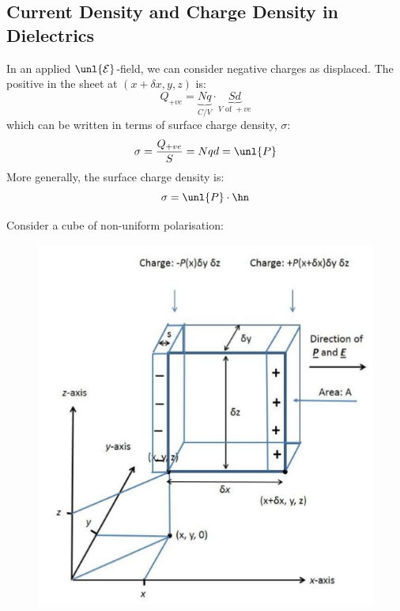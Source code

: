 \documentclass[a4paper, 11pt, normalem]{report}
\renewcommand\E{\mathcal{E}}
\newcommand\uE{\unl{\E}}
\begin{document}
\subsection{Current Density and Charge Density in Dielectrics}
In an applied $\uE$-field, we can consider negative charges as displaced.
The positive in the sheet at $(x+\delta x, y, z)$ is:
\begin{equation}
    Q_{+ve} = \underbrace{Nq}_{C/V} \cdot \underbrace{Sd}_{V \text{ of }+ve}
\end{equation}
which can be written in terms of surface charge density, $\sigma$:
\begin{equation}
    \sigma = \frac{Q_{+ve}}{S} = Nqd = \unl{P}
\end{equation}
More generally, the surface charge density is:
\begin{equation}
    \sigma = \unl{P}\cdot\hn
\end{equation}

Consider a cube of non-uniform polarisation:

\begin{figure}
	\centering
	\includegraphics[scale=0.38]{dibox.png}
\end{figure}
\end{document}
